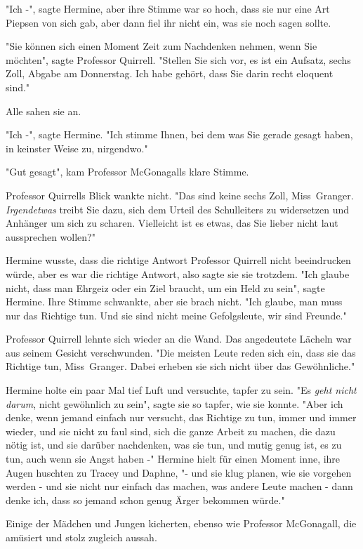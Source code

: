 {"Ich -", sagte Hermine, aber ihre Stimme war so hoch, dass sie nur eine Art Piepsen von sich gab, aber dann fiel ihr nicht ein, was sie noch sagen sollte.

"Sie können sich einen Moment Zeit zum Nachdenken nehmen, wenn Sie möchten", sagte Professor Quirrell. "Stellen Sie sich vor, es ist ein Aufsatz, sechs Zoll, Abgabe am Donnerstag. Ich habe gehört, dass Sie darin recht eloquent sind."

Alle sahen sie an.

"Ich -", sagte Hermine. "Ich stimme Ihnen, bei dem was Sie gerade gesagt haben, in keinster Weise zu, nirgendwo."

"Gut gesagt", kam Professor McGonagalls klare Stimme.

Professor Quirrells Blick wankte nicht. "Das sind keine sechs Zoll, Miss~Granger. \emph{Irgendetwas} treibt Sie dazu, sich dem Urteil des Schulleiters zu widersetzen und Anhänger um sich zu scharen. Vielleicht ist es etwas, das Sie lieber nicht laut aussprechen wollen?"

Hermine wusste, dass die richtige Antwort Professor Quirrell nicht beeindrucken würde, aber es war die richtige Antwort, also sagte sie sie trotzdem. "Ich glaube nicht, dass man Ehrgeiz oder ein Ziel braucht, um ein Held zu sein", sagte Hermine. Ihre Stimme schwankte, aber sie brach nicht. "Ich glaube, man muss nur das Richtige tun. Und sie sind nicht meine Gefolgsleute, wir sind Freunde."

Professor Quirrell lehnte sich wieder an die Wand. Das angedeutete Lächeln war aus seinem Gesicht verschwunden. "Die meisten Leute reden sich ein, dass sie das Richtige tun, Miss~Granger. Dabei erheben sie sich nicht über das Gewöhnliche."

Hermine holte ein paar Mal tief Luft und versuchte, tapfer zu sein. "Es \emph{geht nicht darum}, nicht gewöhnlich zu sein", sagte sie so tapfer, wie sie konnte. "Aber ich denke, wenn jemand einfach nur versucht, das Richtige zu tun, immer und immer wieder, und sie nicht zu faul sind, sich die ganze Arbeit zu machen, die dazu nötig ist, und sie darüber nachdenken, was sie tun, und mutig genug ist, es zu tun, auch wenn sie Angst haben -" Hermine hielt für einen Moment inne, ihre Augen huschten zu Tracey und Daphne, "- und sie klug planen, wie sie vorgehen werden - und sie nicht nur einfach das machen, was andere Leute machen - dann denke ich, dass so jemand schon genug Ärger bekommen würde."

Einige der Mädchen und Jungen kicherten, ebenso wie Professor McGonagall, die amüsiert und stolz zugleich aussah.

}
